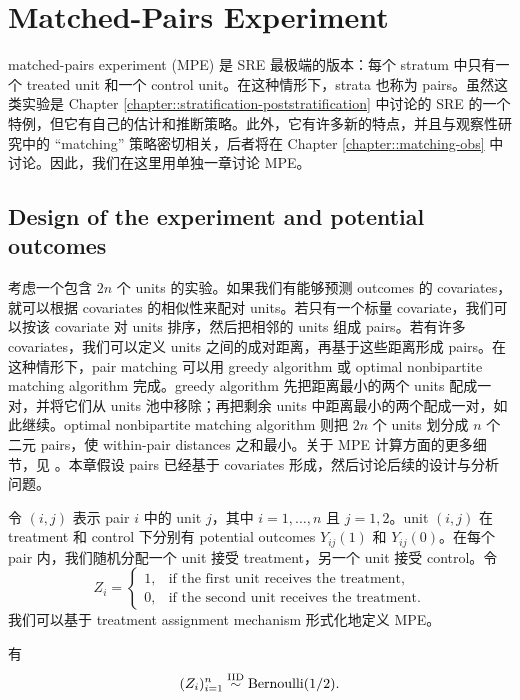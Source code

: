 
\chapter{Matched-Pairs Experiment}
 \label{chapter::mpe}
 
matched-pairs experiment (MPE) 是 SRE 最极端的版本：每个 stratum 中只有一个 treated unit 和一个 control unit。在这种情形下，strata 也称为 pairs。虽然这类实验是 Chapter \ref{chapter::stratification-poststratification} 中讨论的 SRE 的一个特例，但它有自己的估计和推断策略。此外，它有许多新的特点，并且与观察性研究中的 ``matching'' 策略密切相关，后者将在 Chapter \ref{chapter::matching-obs} 中讨论。因此，我们在这里用单独一章讨论 MPE。





\section{Design of the experiment and potential outcomes}
 
考虑一个包含 $2n$ 个 units 的实验。如果我们有能够预测 outcomes 的 covariates，就可以根据 covariates 的相似性来配对 units。若只有一个标量 covariate，我们可以按该 covariate 对 units 排序，然后把相邻的 units 组成 pairs。若有许多 covariates，我们可以定义 units 之间的成对距离，再基于这些距离形成 pairs。在这种情形下，pair matching 可以用 greedy algorithm 或 optimal nonbipartite matching algorithm 完成。greedy algorithm 先把距离最小的两个 units 配成一对，并将它们从 units 池中移除；再把剩余 units 中距离最小的两个配成一对，如此继续。optimal nonbipartite matching algorithm 则把 $2n$ 个 units 划分成 $n$ 个二元 pairs，使 within-pair distances 之和最小。关于 MPE 计算方面的更多细节，见 \citet{greevy2004optimal}。本章假设 pairs 已经基于 covariates 形成，然后讨论后续的设计与分析问题。


令 $(i,j)$ 表示 pair $i$ 中的 unit $j$，其中 $i=1,\ldots, n$ 且 $j=1,2$。unit $(i, j)$ 在 treatment 和 control 下分别有 potential outcomes $Y_{ij}(1)$ 和 $Y_{ij}(0)$。在每个 pair 内，我们随机分配一个 unit 接受 treatment，另一个 unit 接受 control。令
$$
Z_i = \begin{cases}
   1,& \text{if the first unit receives the treatment}, \\
   0, & \text{if the second unit receives the treatment}. 
\end{cases}  
$$ 
我们可以基于 treatment assignment mechanism 形式化地定义 MPE。


\begin{definition}
[MPE]
有
\begin{eqnarray}
 (Z_i)_{i=1}^n \stackrel{\textup{IID}}{\sim} \text{Bernoulli}(1/2).
 \label{eq::mp-treatment}
\end{eqnarray} 
\end{definition}

